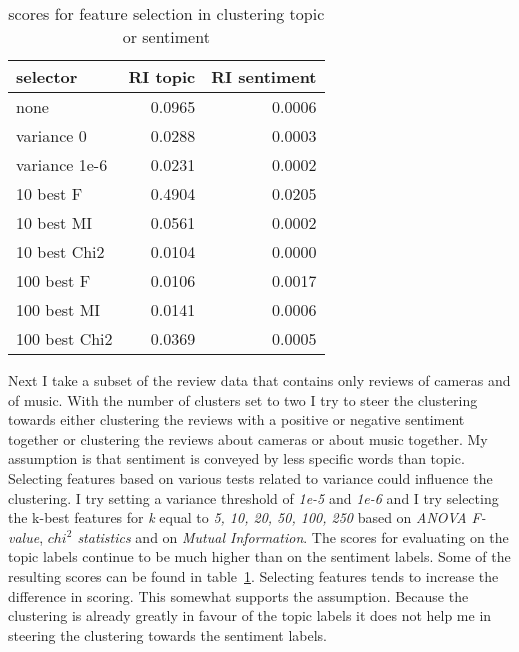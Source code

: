 \documentclass[11pt]{article}
\begin{document}
\begin{table}[ht]\footnotesize
\centering
\caption{scores for feature selection in clustering topic or sentiment}
\label{tab:clust-select}
\begin{tabular}{ l r r }
selector & RI topic & RI sentiment \\
\hline
none           & 0.0965 & 0.0006 \\
variance 0     & 0.0288 & 0.0003 \\
variance 1e-6  & 0.0231 & 0.0002 \\
10  best F     & 0.4904 & 0.0205 \\
10  best MI    & 0.0561 & 0.0002 \\
10  best Chi2  & 0.0104 & 0.0000 \\
100 best F     & 0.0106 & 0.0017 \\
100 best MI    & 0.0141 & 0.0006 \\
100 best Chi2  & 0.0369 & 0.0005 \\
\end{tabular}
\end{table}

Next I take a subset of the review data that contains only reviews of cameras and of music. With the number of clusters set to two I try to steer the clustering towards either clustering the reviews with a positive or negative sentiment together or clustering the reviews about cameras or about music together. My assumption is that sentiment is conveyed by less specific words than topic. Selecting features based on various tests related to variance could influence the clustering. I try setting a variance threshold of \emph{1e-5} and \emph{1e-6} and I try selecting the k-best features for \emph{k} equal to \emph{5, 10, 20, 50, 100, 250} based on \emph{ANOVA F-value}, \emph{$chi^2$ statistics} and on \emph{Mutual Information}. The scores for evaluating on the topic labels continue to be much higher than on the sentiment labels. Some of the resulting scores can be found in table~\ref{tab:clust-select}. Selecting features tends to increase the difference in scoring. This somewhat supports the assumption. Because the clustering is already greatly in favour of the topic labels it does not help me in steering the clustering towards the sentiment labels.
\end{document}
